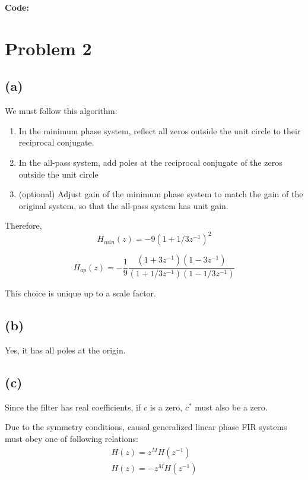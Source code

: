 \documentclass{article}
\begin{document}
\textbf{Code:}

\newpage

\section{Problem 2}
\subsection{(a)}

\begin{figure}[!h]
	\resizebox{0.9\textwidth}{!}{}
\end{figure}

We must follow this algorithm:
\begin{enumerate}
	\item In the minimum phase system, reflect all zeros outside the unit circle to their reciprocal conjugate.
	\item In the all-pass system, add poles at the reciprocal conjugate of the zeros outside the unit circle
	\item (optional) Adjust gain of the minimum phase system to match the gain of the original system, so that the all-pass system has unit gain.
\end{enumerate}

Therefore,
\begin{equation}
H_{min}(z) = -9(1 + 1/3z^{-1})^2
\end{equation}

\begin{equation}
H_{ap}(z) = -\frac{1}{9}\frac{(1 + 3z^{-1})(1 - 3z^{-1})}{(1 + 1/3z^{-1})(1 - 1/3z^{-1})}
\end{equation}
	
This choice is unique up to a scale factor.
	
\subsection{(b)}
Yes, it has all poles at the origin.

\subsection{(c)}

Since the filter has real coefficients, if $c$ is a zero, $c^*$ must also be a zero.

Due to the symmetry conditions, causal generalized linear phase FIR systems must obey one of following relations:
\begin{align*}
H(z) = z^MH(z^{-1}) \tag{if even symmetric} \\
H(z) = -z^MH(z^{-1}) \tag{if odd symmetric} \\
\end{align*}
\end{document}
